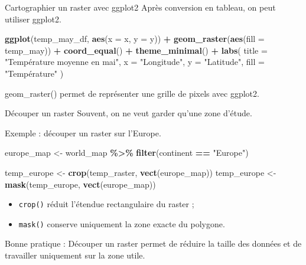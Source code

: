 \documentclass[
  10pt,
  ignorenonframetext,
]{beamer}
\newenvironment{Shaded}{\begin{snugshade}}{\end{snugshade}}
\newcommand{\AttributeTok}[1]{\textcolor[rgb]{0.13,0.29,0.53}{#1}}
\newcommand{\FunctionTok}[1]{\textcolor[rgb]{0.13,0.29,0.53}{\textbf{#1}}}
\newcommand{\NormalTok}[1]{#1}
\newcommand{\OtherTok}[1]{\textcolor[rgb]{0.56,0.35,0.01}{#1}}
\newcommand{\SpecialCharTok}[1]{\textcolor[rgb]{0.81,0.36,0.00}{\textbf{#1}}}
\newcommand{\StringTok}[1]{\textcolor[rgb]{0.31,0.60,0.02}{#1}}
\begin{document}
\begin{frame}[fragile]{Cartographier un raster avec ggplot2}
\label{cartographier-un-raster-avec-ggplot2}
Après conversion en tableau, on peut utiliser ggplot2.

\begin{Shaded}
\begin{Highlighting}[]
\FunctionTok{ggplot}\NormalTok{(temp\_may\_df, }\FunctionTok{aes}\NormalTok{(}\AttributeTok{x =}\NormalTok{ x, }\AttributeTok{y =}\NormalTok{ y)) }\SpecialCharTok{+}
  \FunctionTok{geom\_raster}\NormalTok{(}\FunctionTok{aes}\NormalTok{(}\AttributeTok{fill =}\NormalTok{ temp\_may)) }\SpecialCharTok{+}
  \FunctionTok{coord\_equal}\NormalTok{() }\SpecialCharTok{+}
  \FunctionTok{theme\_minimal}\NormalTok{() }\SpecialCharTok{+}
  \FunctionTok{labs}\NormalTok{(}
    \AttributeTok{title =} \StringTok{"Température moyenne en mai"}\NormalTok{,}
    \AttributeTok{x =} \StringTok{"Longitude"}\NormalTok{,}
    \AttributeTok{y =} \StringTok{"Latitude"}\NormalTok{,}
    \AttributeTok{fill =} \StringTok{"Température"}
\NormalTok{  )}
\end{Highlighting}
\end{Shaded}

geom\_raster() permet de représenter une grille de pixels avec ggplot2.
\end{frame}

\begin{frame}[fragile]{Découper un raster}
\label{duxe9couper-un-raster}
Souvent, on ne veut garder qu'une zone d'étude.

Exemple : découper un raster sur l'Europe.

\begin{Shaded}
\begin{Highlighting}[]
\NormalTok{europe\_map }\OtherTok{\textless{}{-}}\NormalTok{ world\_map }\SpecialCharTok{\%\textgreater{}\%}
  \FunctionTok{filter}\NormalTok{(continent }\SpecialCharTok{==} \StringTok{"Europe"}\NormalTok{)}

\NormalTok{temp\_europe }\OtherTok{\textless{}{-}} \FunctionTok{crop}\NormalTok{(temp\_raster, }\FunctionTok{vect}\NormalTok{(europe\_map))}
\NormalTok{temp\_europe }\OtherTok{\textless{}{-}} \FunctionTok{mask}\NormalTok{(temp\_europe, }\FunctionTok{vect}\NormalTok{(europe\_map))}
\end{Highlighting}
\end{Shaded}

\begin{itemize}
\item \texttt{crop()} réduit l’étendue rectangulaire du raster ;
\item \texttt{mask()} conserve uniquement la zone exacte du polygone.
\end{itemize}

Bonne pratique : Découper un raster permet de réduire la taille des
données et de travailler uniquement sur la zone utile.
\end{frame}
\end{document}
